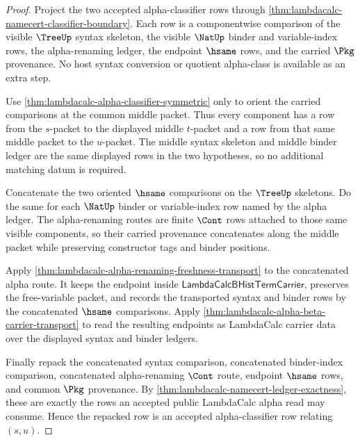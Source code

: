\begin{proof}
Project the two accepted alpha-classifier rows through
\autoref{thm:lambdacalc-namecert-classifier-boundary}. Each row is a
componentwise comparison of the visible $\TreeUp$ syntax skeleton, the visible
$\NatUp$ binder and variable-index rows, the alpha-renaming ledger, the
endpoint $\hsame$ rows, and the carried $\Pkg$ provenance. No host syntax
conversion or quotient alpha-class is available as an extra step.

Use \autoref{thm:lambdacalc-alpha-classifier-symmetric} only to orient the
carried comparisons at the common middle packet. Thus every component has a
row from the $s$-packet to the displayed middle $t$-packet and a row from that
same middle packet to the $u$-packet. The middle syntax skeleton and middle
binder ledger are the same displayed rows in the two hypotheses, so no
additional matching datum is required.

Concatenate the two oriented $\hsame$ comparisons on the $\TreeUp$ skeletons.
Do the same for each $\NatUp$ binder or variable-index row named by the alpha
ledger. The alpha-renaming routes are finite $\Cont$ rows attached to those
same visible components, so their carried provenance concatenates along the
middle packet while preserving constructor tags and binder positions.

Apply \autoref{thm:lambdacalc-alpha-renaming-freshness-transport} to the
concatenated alpha route. It keeps the endpoint inside
$\mathsf{LambdaCalcBHistTermCarrier}$, preserves the free-variable packet, and
records the transported syntax and binder rows by the concatenated $\hsame$
comparisons. Apply \autoref{thm:lambdacalc-alpha-beta-carrier-transport} to
read the resulting endpoints as LambdaCalc carrier data over the displayed
syntax and binder ledgers.

Finally repack the concatenated syntax comparison, concatenated binder-index
comparison, concatenated alpha-renaming $\Cont$ route, endpoint $\hsame$ rows,
and common $\Pkg$ provenance. By
\autoref{thm:lambdacalc-namecert-ledger-exactness}, these are exactly the rows
an accepted public LambdaCalc alpha read may consume. Hence the repacked row is
an accepted alpha-classifier row relating $(s,u)$.
\end{proof}


